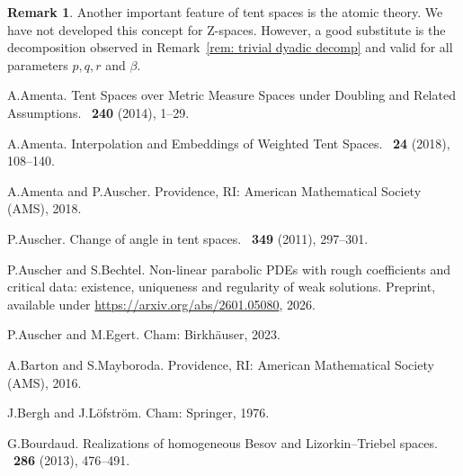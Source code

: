 \documentclass[11pt, leqno,parskip=half]{amsart}
\theoremstyle{definition}
\newtheorem{remark}[theorem]{Remark}
\newcommand{\Z}{\mathrm{Z}}
\numberwithin{equation}{section}
\begin{document}
\begin{remark}
    Another important feature of tent spaces is the atomic theory. We have not developed this concept for $\Z$-spaces. However, a good substitute is the decomposition observed in Remark~\ref{rem: trivial dyadic decomp} and valid for all parameters $p,q,r$ and $\beta$.
\end{remark}




\begin{bibdiv}
\begin{biblist}

A.\@ Amenta.
\newblock Tent Spaces over Metric Measure Spaces under Doubling and Related Assumptions.
~\textbf{240} (2014), 1--29.

A.\@ Amenta.
\newblock Interpolation and Embeddings of Weighted Tent Spaces.
~\textbf{24} (2018), 108--140.

A.\@ Amenta and P.\@ Auscher.
\newblock Providence, RI: American Mathematical Society (AMS), 2018.

P.\@ Auscher.
\newblock Change of angle in tent spaces.
~\textbf{349} (2011), 297--301.

P.\@ Auscher and S.\@ Bechtel.
\newblock Non-linear parabolic {PDEs} with rough coefficients and critical data: existence, uniqueness and regularity of weak solutions.
\newblock Preprint, available under \url{https://arxiv.org/abs/2601.05080}, 2026.

P.\@ Auscher and M.\@ Egert.
\newblock Cham: Birkhäuser, 2023.

A.\@ Barton and S.\@ Mayboroda.
\newblock  Providence, RI: American Mathematical Society (AMS), 2016.

J.\@ Bergh and J.\@ Löfström.
\newblock Cham: Springer, 1976.

G.\@ Bourdaud.
\newblock Realizations of homogeneous Besov and Lizorkin--Triebel spaces.
~\textbf{286} (2013), 476--491.


\end{biblist}
\end{bibdiv}
\end{document}
